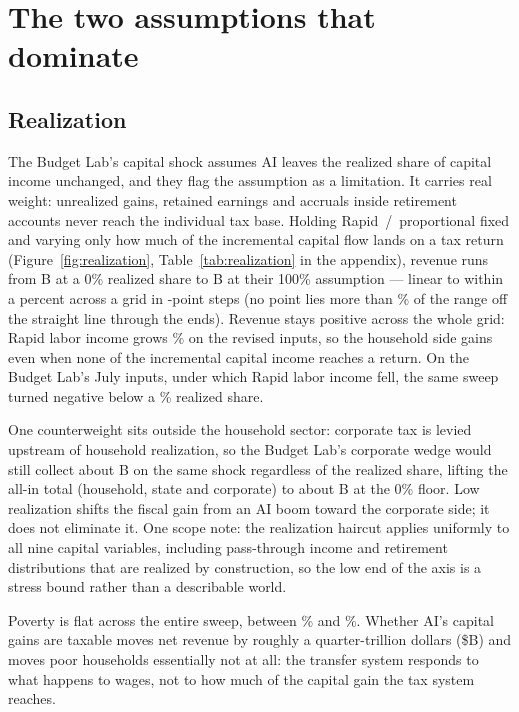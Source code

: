\section{The two assumptions that dominate}\label{sec:sensitivity}

\subsection{Realization}\label{sec:realization}

The Budget Lab's capital shock assumes AI leaves the realized share of
capital income unchanged, and they flag the assumption as a limitation.
It carries real weight: unrealized gains, retained earnings and accruals
inside retirement accounts never reach the individual tax base. Holding
Rapid~/~proportional fixed and varying only how much of the incremental
capital flow lands on a tax return (Figure~\ref{fig:realization},
Table~\ref{tab:realization} in the appendix), revenue runs from
\genRealZeroRev B at a 0\% realized share to \genRealFullRev B at their
100\% assumption --- linear to within a percent across a grid in
\genRealGridStepPct-point steps (no point lies more than
\genRealLineMaxGapPct\% of the range off the straight line through the
ends). Revenue stays positive across the whole grid: Rapid labor income grows
\genRapidCompLaborPct\% on the revised inputs, so the household side gains
even when none of the incremental capital income reaches a return. On the
Budget Lab's July inputs, under which Rapid labor income fell, the same sweep
turned negative below a \genRevRealBreakevenOldPct\% realized share.

One counterweight sits outside the household sector: corporate tax is levied
upstream of household realization, so the Budget Lab's corporate wedge would
still collect about \genTheirRapidCit B on the same shock regardless of the
realized share, lifting the all-in total (household, state and corporate) to
about \genRealZeroAllIn B at the 0\% floor. Low realization shifts the fiscal
gain from an AI boom toward the corporate side; it does not eliminate it. One scope note: the realization haircut applies
uniformly to all nine capital variables, including pass-through income and
retirement distributions that are realized by construction, so the low end
of the axis is a stress bound rather than a describable world.

Poverty is flat across the entire sweep, between \genRealPovMinPct\% and
\genRealPovMaxPct\%. Whether AI's capital gains are taxable moves net revenue
by roughly a quarter-trillion dollars (\$\genRealFullLessZeroB B) and moves
poor households essentially not at all: the transfer system responds to what
happens to wages, not to how much of the capital gain the tax system
reaches.

